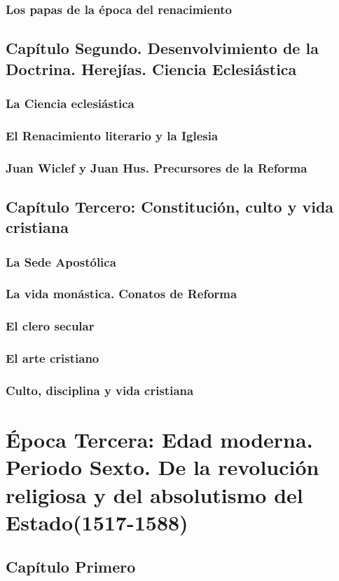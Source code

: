 \raggedbottom{} \documentclass[12pt]{book}
\begin{document}
\section{Los papas de la época del renacimiento}
\chapter{Capítulo Segundo. Desenvolvimiento de la Doctrina. Herejías. Ciencia Eclesiástica}
\section{La Ciencia eclesiástica}
\section{El Renacimiento literario y la Iglesia}
\section{Juan Wiclef y Juan Hus. Precursores de la Reforma}
\chapter{Capítulo Tercero: Constitución, culto y vida cristiana}
\section{La Sede Apostólica}
\section{La vida monástica. Conatos de Reforma}
\section{El clero secular}
\section{El arte cristiano}
\section{Culto, disciplina y vida cristiana}
\part{Época Tercera: Edad moderna. Periodo Sexto. De la revolución religiosa y del absolutismo del Estado(1517-1588)}
\chapter{Capítulo Primero}
\end{document}
